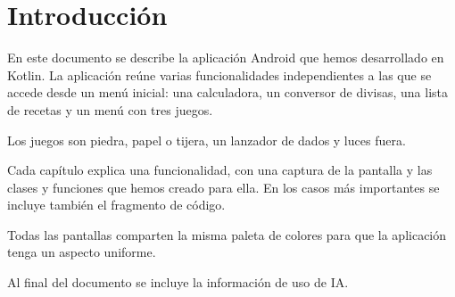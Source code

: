 \chapter{Introducción}
En este documento se describe la aplicación Android que hemos desarrollado en Kotlin.
La aplicación reúne varias funcionalidades independientes a las que se accede desde un menú inicial: una calculadora, un conversor de divisas, una lista de recetas y un menú con tres juegos.

Los juegos son piedra, papel o tijera, un lanzador de dados y luces fuera.

Cada capítulo explica una funcionalidad, con una captura de la pantalla y las clases y funciones que hemos creado para ella.
En los casos más importantes se incluye también el fragmento de código.

Todas las pantallas comparten la misma paleta de colores para que la aplicación tenga un aspecto uniforme.

Al final del documento se incluye la información de uso de IA.